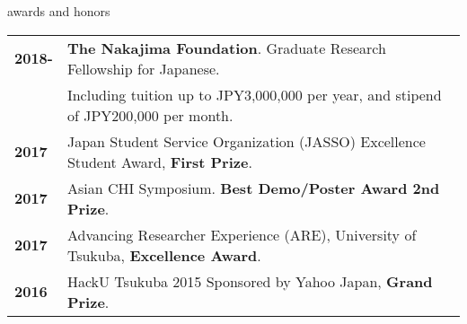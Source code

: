 \documentclass{resume} %
\begin{document}
\begin{rSection}{awards and honors}
\begin{tabular}{ @{} >{\bfseries}l @{\hspace{4ex}} l }
2018- & \textbf{The Nakajima Foundation}. Graduate Research Fellowship for Japanese. \\
 & \textbf{}Including tuition up to JPY3,000,000 per year, and stipend of JPY200,000 per month.\\
2017 & Japan Student Service Organization (JASSO) Excellence Student Award, \textbf{First Prize}. \\
2017 & Asian CHI Symposium. \textbf{Best Demo/Poster Award 2nd Prize}. \\
2017 & Advancing Researcher Experience (ARE), University of Tsukuba, \textbf{Excellence Award}. \\
2016 & HackU Tsukuba 2015 Sponsored by Yahoo Japan, \textbf{Grand Prize}. \\

\end{tabular}

\end{rSection}
\end{document}

